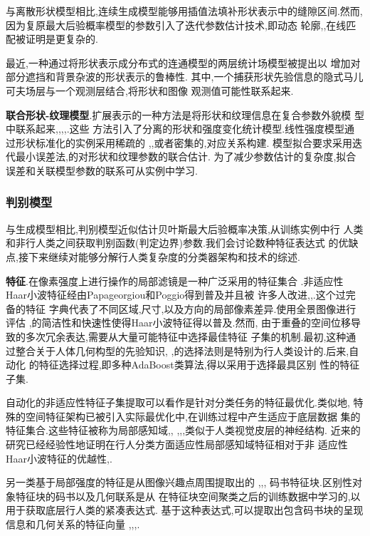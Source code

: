 \documentclass[10pt,letterpaper,journal,compsoc]{IEEEtran}
\begin{document}
与离散形状模型相比,连续生成模型能够用插值法填补形状表示中的缝隙区间.然而,
因为复原最大后验概率模型的参数引入了迭代参数估计技术,即动态
轮廓\cite{bib9},\cite{bib50},在线匹配被证明是更复杂的.

最近,一种通过将形状表示成分布式的连通模型的两层统计场模型\cite{bib77}被提出以
增加对部分遮挡和背景杂波的形状表示的鲁棒性.
其中,一个捕获形状先验信息的隐式马儿可夫场层与一个观测层结合,将形状和图像
观测值可能性联系起来.

\textbf{联合形状-纹理模型}.扩展表示的一种方法是将形状和纹理信息在复合参数外貌模
型中联系起来\cite{bib8},\cite{bib9},\cite{bib14},\cite{bib17},\cite{bib34}.这些
方法引入了分离的形状和强度变化统计模型.线性强度模型通过形状标准化的实例采用稀疏的
\cite{bib9},\cite{bib14},\cite{bib17}或者密集的\cite{bib8},\cite{bib34}对应关系构建.
模型拟合要求采用迭代最小误差法\cite{bib17},\cite{bib34}的对形状和纹理参数的联合估计.
为了减少参数估计的复杂度,拟合误差和关联模型参数的联系可从实例中学习\cite{bib9}.
\subsubsection{判别模型}
与生成模型相比,判别模型近似估计贝叶斯最大后验概率决策,从训练实例中行
人类和非行人类之间获取判别函数(判定边界)参数.我们会讨论数种特征表达式
的优缺点,接下来继续对能够分解行人类复杂度的分类器架构和技术的综述.

\textbf{特征}.在像素强度上进行操作的局部滤镜是一种广泛采用的特征集合
\cite{bib59}.非适应性Haar小波特征经由Papageorgiou和Poggio得到普及并且被
许多人改进\cite{bib48},\cite{bib64},\cite{bib74}.这个过完备的特征
字典代表了不同区域,尺寸,以及方向的局部像素差异.使用全景图像进行评估
\cite{bib41},\cite{bib74}的简洁性和快速性使得Haar小波特征得以普及.然而,
由于重叠的空间位移导致的多次冗余表达,需要从大量可能特征中选择最佳特征
子集的机制.最初,这种通过整合关于人体几何构型的先验知识\cite{bib48},
\cite{bib53},\cite{bib64}的选择法则是特别为行人类设计的.后来,自动化
的特征选择过程,即多种AdaBoost类算法\cite{bib18},得以采用于选择最具区别
性的特征子集\cite{bib74}.

自动化的非适应性特征子集提取可以看作是针对分类任务的特征最优化.类似地,
特殊的空间特征架构已被引入实际最优化中,在训练过程中产生适应于底层数据
集的特征集合.这些特征被称为局部感知域\cite{bib19},\cite{bib23},
\cite{bib49},\cite{bib68},\cite{bib75},类似于人类视觉皮层的神经结构.
近来的研究已经经验性地证明在行人分类方面适应性局部感知域特征相对于非
适应性Haar小波特征的优越性\cite{bib49},\cite{bib68}.

另一类基于局部强度的特征是从图像兴趣点周围提取出的
\cite{bib1},\cite{bib39},\cite{bib40},\cite{bib61}
码书特征块.区别性对象特征块的码书以及几何联系是从
在特征块空间聚类之后的训练数据中学习的,以用于获取底层行人类的紧凑表达式.
基于这种表达式,可以提取出包含码书块的呈现信息和几何关系的特征向量
\cite{bib1},\cite{bib39},\cite{bib40},\cite{bib61}.
\end{document}

